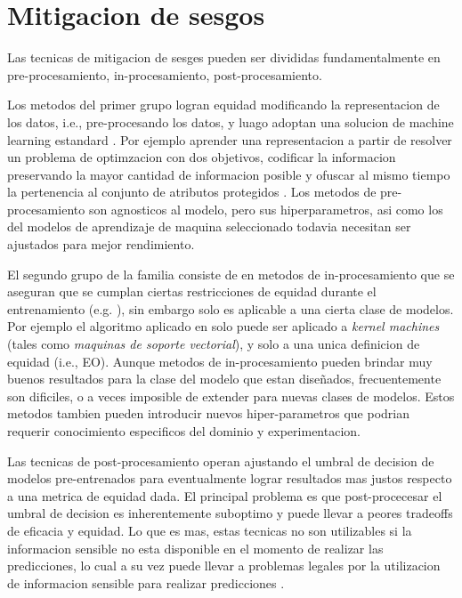\section{Mitigacion de sesgos}\label{section:mitigation}


Las tecnicas de mitigacion de sesges pueden ser divididas fundamentalmente en pre-procesamiento, in-procesamiento, post-procesamiento. 

Los metodos del primer grupo logran equidad modificando la representacion de los datos, i.e., pre-procesando los datos, y luago adoptan una solucion de machine learning estandard \parencite{nips2017preproc, Kamiran2011DataPT, zemel2013learning}. Por ejemplo aprender una representacion a partir de resolver un problema de optimzacion con dos objetivos, codificar la informacion preservando la mayor cantidad de informacion posible y ofuscar al mismo tiempo la pertenencia al conjunto de atributos protegidos \parencite{zemel2013learning}. Los metodos de pre-procesamiento son agnosticos al modelo, pero sus hiperparametros, asi como los del modelos de aprendizaje de maquina seleccionado todavia necesitan ser ajustados para mejor rendimiento.

El segundo grupo de la familia consiste de en metodos de in-procesamiento que se aseguran que se cumplan ciertas restricciones de equidad durante el entrenamiento (e.g. \parencite{donini2018empirical, zafar2017fairness, zafar2019fairness}), sin embargo solo es aplicable a una cierta clase de modelos. Por ejemplo el algoritmo aplicado en \parencite{donini2018empirical} solo puede ser aplicado a \textit{kernel machines} (tales como \textit{maquinas de soporte vectorial}), y solo a una unica definicion de equidad (i.e., EO). Aunque metodos de in-procesamiento pueden brindar muy buenos resultados para la clase del modelo que estan diseñados, frecuentemente son dificiles, o a veces imposible de extender para nuevas clases de modelos. Estos metodos tambien pueden introducir nuevos hiper-parametros que podrian requerir conocimiento especificos del dominio y experimentacion.

Las tecnicas de post-procesamiento operan ajustando el umbral de decision de modelos pre-entrenados para eventualmente lograr resultados mas justos respecto a una metrica de equidad dada. El principal problema es que post-procecesar el umbral de decision es inherentemente suboptimo y puede llevar a peores tradeoffs de eficacia y equidad. Lo que es mas, estas tecnicas no son utilizables si la informacion sensible no esta disponible en el momento de realizar las predicciones, lo cual a su vez puede llevar a problemas legales por la utilizacion de informacion sensible para realizar predicciones \parencite{MacCarthy2018StandardsOF}.

